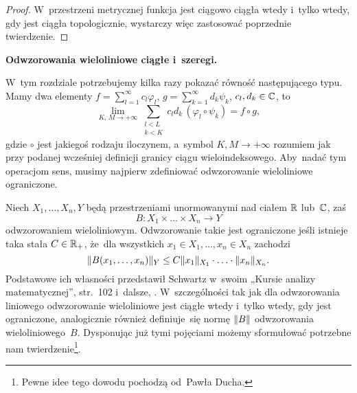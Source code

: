 \documentclass[a4paper,11pt]{article}
\begin{document}
\begin{proof}

  W~przestrzeni metrycznej funkcja jest ciągowo ciągła wtedy i~tylko wtedy,
  gdy jest ciągła topologicznie, wystarczy więc zastosować poprzednie
  twierdzenie.

\end{proof}

\vspace{\spaceFour}



\start \textbf{Odwzorowania wieloliniowe ciągłe i~szeregi.}

W~tym
rozdziale potrzebujemy kilka razy pokazać równość następującego typu.
Mamy dwa elementy $f = \sum_{ l = 1 }^{ \infty } c_{ l } \varphi_{ l }$,
$g = \sum_{ k = 1 }^{ \infty } d_{ k } \psi_{ k }$,
$c_{ l }, d_{ k } \in \mathbb{C}$, to
\begin{equation}
  \label{eq:RS-Vol-I-s02-01}
  \lim\limits_{ K,\, M \to +\infty } \sum_{ \substack{ l < L \\ k < K } }
  c_{ l } d_{ k } \, ( \varphi_{ l } \circ \psi_{ k } ) = f \circ g,
\end{equation}
gdzie $\circ$ jest jakiegoś rodzaju iloczynem, a~symbol
$K, M \to +\infty$ rozumiem jak przy podanej wcześniej definicji
granicy ciągu wieloindeksowego. Aby~nadać tym operacjom sens, musimy
najpierw zdefiniować odwzorowanie wieloliniowe ograniczone.

Niech $X_{ 1 }, \ldots, X_{ n }, Y$ będą przestrzeniami unormowanymi nad
ciałem $\mathbb{R}$ lub~$\mathbb{C}$, zaś
\begin{equation}
  \label{eq:RS-Vol-I-s02-02}
  B: X_{ 1 } \times \ldots \times X_{ n } \to Y
\end{equation}
odwzorowaniem wieloliniowym. Odwzorowanie takie jest ograniczone jeśli
istnieje taka stała $C \in \mathbb{R}_{ + }$, że~dla wszystkich
$x_{ 1 } \in X_{ 1 }, \ldots, x_{ n } \in X_{ n }$ zachodzi
\begin{equation}
  \label{eq:RS-Vol-I-02-03}
  \lVert{  B( x_{ 1 }, \ldots, x_{ n } )  }\rVert_{ Y } \leq
  C \lVert{  x_{ 1 }  }\rVert_{ X_{ 1 } } \cdot \ldots \cdot \lVert{  x_{ n }  }\rVert_{ X_{ n } }.
\end{equation}
Podstawowe ich własności przedstawił Schwartz w~swoim „Kursie analizy
matematycznej”, str.~102 i~dalsze,
\cite{SchwartzKursAnalizyMatematycznejVolI1979}. W~szczególności tak jak dla
odwzorowania liniowego odwzorowanie wieloliniowe jest ciągłe wtedy i~tylko wtedy, gdy
jest ograniczone, analogicznie również definiuje~się normę
$\lVert{  B  }\rVert$ odwzorowania wieloliniowego~$B$. Dysponując już tymi
pojęciami możemy sformułować potrzebne nam twierdzenie\footnote{Pewne
  idee tego dowodu pochodzą od~Pawła Ducha.}.
\end{document}
